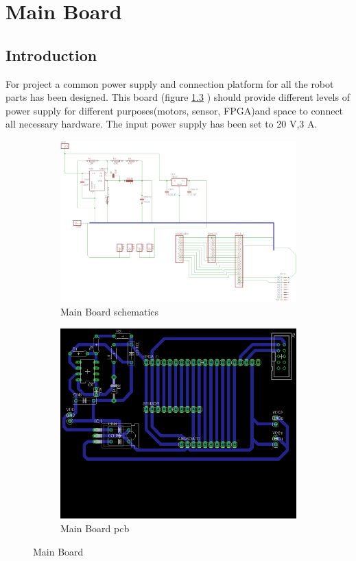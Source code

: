 \chapter{Main Board}
\section{Introduction}
For project a common power supply and connection platform for all the robot parts has been designed. This board (figure \ref{fig:Main Board} ) should provide different levels of power supply for different purposes(motors, sensor, FPGA)and space  to connect all necessary hardware.
The input power supply has been set to 20 V,3 A.

\begin{figure}[!ht]
	\begin{subfigure}{.49\textwidth}
		\centering
		\includegraphics[width=1\textwidth]{figures/Main_board_schematics}
		\caption{Main Board schematics}
		\label{fig:MainSchematics}
	\end{subfigure}
	\begin{subfigure}{.49\textwidth}
		\centering
		\includegraphics[width=1\textwidth]{figures/Main_board_brd}
		\caption{Main Board pcb}
		\label{fig:MainBRD}
	\end{subfigure}
\caption{Main Board}
\label{fig:Main Board}
\end{figure}

